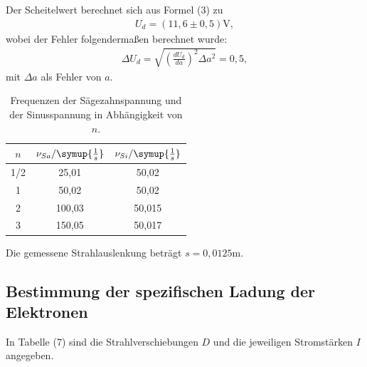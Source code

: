 \noindent Der Scheitelwert berechnet sich aus Formel (3) zu
\begin{align*}
U_d = (11,6 \pm 0,5) \si{\volt} ,
\end{align*}
wobei der Fehler folgendermaßen berechnet wurde:
\begin{align*}
\Delta U_d = \sqrt{(\frac{dU_d}{da})^2\Delta a^2} = 0,5 ,
\end{align*}
mit $\Delta a$ als Fehler von $a$.

\begin{table}[H]
  \centering
  \caption{Frequenzen der Sägezahnspannung und der Sinusspannung in Abhängigkeit von $n$.}
  \label{tab:Spannungsamplitude}
  \begin{tabular}{c c c}
    \toprule
    $n$ & $\nu_{Sa} / \symup{\frac{1}{s}}$ & $\nu_{Si} / \symup{\frac{1}{s}}$\\
    \midrule
    1/2 &  25,01 & 50,02 \\
      1 &  50,02 & 50,02 \\
      2 & 100,03 & 50,015 \\
      3 & 150,05 & 50,017\\
    \bottomrule
  \end{tabular}
\end{table}

\noindent Die gemessene Strahlauslenkung beträgt $s = 0,0125 \si{\m} $.

























\subsection{Bestimmung der spezifischen Ladung der Elektronen}
In Tabelle (7) sind die Strahlverschiebungen $D$ und die jeweiligen Stromstärken $I$ angegeben.


